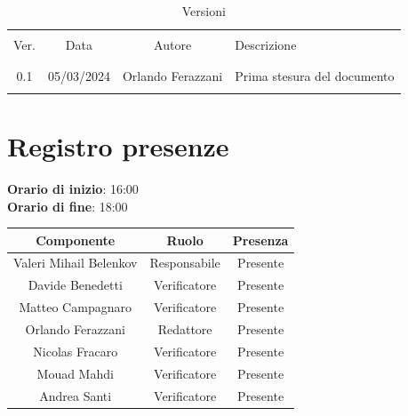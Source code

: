 \documentclass[italian, 12pt]{article}
\begin{document}
\pagestyle{mystyle}


\begin{table}[!h]
	\caption{Versioni}
	\begin{center}
		\begin{tabular}{ c c c p{9cm}}
			\hline \\[-2ex]
			Ver. & Data & Autore & Descrizione \\
			\\[-2ex] \hline \\[-1.5ex]
			0.1 & 05/03/2024 & Orlando Ferazzani& Prima stesura del documento\\
			\\[-1.5ex] \hline
		\end{tabular}
	\end{center}
\end{table}


\tableofcontents
\newpage


\section{Registro presenze}

\textbf{Orario di inizio}: 16:00\\
\textbf{Orario di fine}: 18:00\\


\begin{flushleft}
	\begin{table}[!h]
	\begin{tabular}{ |c|c|c| } 
		\hline
		\textbf{Componente} & \textbf{Ruolo} & \textbf{Presenza} \\
  \hline 
		Valeri Mihail Belenkov & Responsabile & Presente \\ 
		Davide Benedetti 	& Verificatore & Presente \\
		Matteo Campagnaro	& Verificatore & Presente \\
		Orlando Ferazzani 	& Redattore & Presente \\
		Nicolas Fracaro 	& Verificatore & Presente \\
		Mouad Mahdi		    & Verificatore & Presente \\ 
		Andrea Santi 	    & Verificatore & Presente \\
		\hline
	\end{tabular}
	\end{table}
	\end{flushleft}
\end{document}
